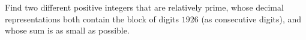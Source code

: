 Find two different positive integers that are relatively prime, whose decimal representations both contain the block of digits $1926$ (as consecutive digits), and whose sum is as small as possible.
